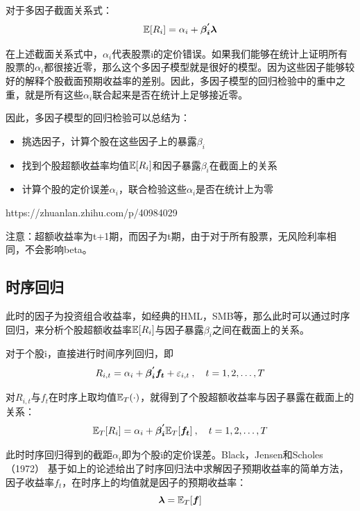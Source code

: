 \documentclass[11pt]{article}
\begin{document}
对于多因子截面关系式：
\begin{equation*}
    \mathbb{E}[R_i] = \alpha_i + \bm{\beta_{i}^{'} \lambda}
\end{equation*}

在上述截面关系式中，$\alpha_i$代表股票i的定价错误。如果我们能够在统计上证明所有股票的$\alpha_i$都很接近零，那么这个多因子模型就是很好的模型。因为这些因子能够较好的解释个股截面预期收益率的差别。因此，多因子模型的回归检验中的重中之重，就是所有这些$\alpha_i$联合起来是否在统计上足够接近零。

因此，多因子模型的回归检验可以总结为：
\begin{itemize}
    \item 挑选因子，计算个股在这些因子上的暴露$\beta_i$
    \item 找到个股超额收益率均值$\mathbb{E}[R_i]$和因子暴露$\beta_i$在截面上的关系
    \item 计算个股的定价误差$\alpha_i$，联合检验这些$\alpha_i$是否在统计上为零
\end{itemize}

https://zhuanlan.zhihu.com/p/40984029

注意：超额收益率为t+1期，而因子为t期，由于对于所有股票，无风险利率相同，不会影响beta。

\subsection{时序回归}

此时的因子为投资组合收益率，如经典的HML，SMB等，那么此时可以通过时序回归，来分析个股超额收益率$\mathbb{E}[R_i]$与因子暴露$\beta_i$之间在截面上的关系。

对于个股i，直接进行时间序列回归，即
\begin{equation*}
    R_{i,t} = \alpha_i + \bm{\beta_{i}^{'} f_t} + \varepsilon_{i,t} \:,\quad t=1,2,\dots,T
\end{equation*}

对$R_{i,t}$与$f_t$在时序上取均值$\mathbb{E}_T(\cdot)$，就得到了个股超额收益率与因子暴露在截面上的关系：
\begin{equation*}
    \mathbb{E}_T[R_i] = \alpha_i + \bm{\beta_{i}^{'}} \mathbb{E}_T[\bm{f_t}] \:,\quad t=1,2,\dots,T
\end{equation*}

此时时序回归得到的截距$\alpha_i$即为个股i的定价误差。Black，Jensen和Scholes（1972） 基于如上的论述给出了时序回归法中求解因子预期收益率的简单方法，因子收益率$f_t$，在时序上的均值就是因子的预期收益率：
\begin{equation*}
    \bm{\lambda} = \mathbb{E}_T[\bm{f}]
\end{equation*}
\end{document}
